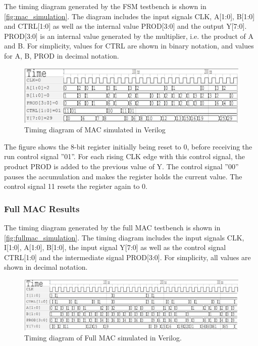 The timing diagram generated by the FSM testbench is shown in \autoref{fig:mac_simulation}. The diagram includes the input signals CLK, A[1:0], B[1:0] and CTRL[1:0] as well as the internal value PROD[3:0] and the output Y[7:0]. PROD[3:0] is an internal value generated by the multiplier, i.e. the product of A and B. For simplicity,
values for CTRL are shown in binary notation, and values for A, B, PROD in decimal notation.

\begin{figure}[H]
    \centering
    \includegraphics[width=\textwidth]{Figures/Result MAC.png}
    \caption{Timing diagram of MAC simulated in Verilog}
    \label{fig:mac_simulation}
\end{figure}

The figure shows the 8-bit register initially being reset to 0, before receiving the run control signal ''01''. For each rising CLK edge with this control signal, the product PROD is added to the previous value of Y. The control signal ''00'' pauses the accumulation and makes the register holds the current value. The control signal 11 resets the register again to 0. 

\subsubsection{Full MAC Results}

The timing diagram generated by the full MAC testbench is shown in \autoref{fig:fullmac_simulation}. The timing diagram includes the input signals CLK, I[1:0], A[1:0], B[1:0], the input signal Y[7:0] as well as the control signal CTRL[1:0] and the intermediate signal PROD[3:0]. For simplicity, all values are shown in decimal notation.

\begin{figure}[H]
    \centering
    \includegraphics[width=\textwidth]{Figures/Result full MAC3.png}
    \caption{Timing diagram of Full MAC simulated in Verilog.}
    \label{fig:fullmac_simulation}
\end{figure}

